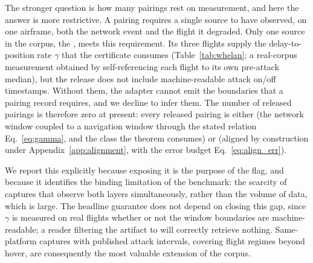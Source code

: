 The stronger question is how many pairings rest on measurement, and here the
answer is more restrictive. A  pairing requires a
single source to have observed, on one airframe, both the network event and the
flight it degraded. Only one source in the corpus, the
, meets this requirement. Its three flights supply
the delay-to-position rate $\gamma$ that the certificate consumes
(Table~\ref{tab:whelan}; a real-corpus measurement obtained by
self-referencing each flight to its own pre-attack median), but the release does
not include machine-readable attack on/off timestamps. Without them, the
adapter cannot emit the  boundaries that a pairing record
requires, and we decline to infer them. The number of released
 pairings is therefore zero at present: every
released pairing is either  (the network window coupled to
a navigation window through the stated relation Eq.~\eqref{eq:gamma}, and the
class the theorem consumes) or  (aligned by
construction under Appendix~\ref{app:alignment}, with the error budget
Eq.~\eqref{eq:align_err}).

We report this explicitly because exposing it is the purpose of the flag, and
because it identifies the binding limitation of the benchmark: the scarcity of
captures that observe both layers simultaneously, rather than the volume of
data, which is large. The headline guarantee does not depend on closing this
gap, since $\gamma$ is measured on real flights whether or not the window
boundaries are machine-readable; a reader filtering the artifact to
 will correctly retrieve nothing. Same-platform captures with published attack intervals, covering
flight regimes beyond hover, are consequently the most valuable extension of
the corpus.

\begin{table}[t]
\centering
\caption{Acquisition provenance across the ingested corpus. Counts come from
the schema-validated adapter outputs, and the split is machine-generated by
 so the paper cannot drift from the
artifact. Acquisition is a property of the source; the strictly stronger
 distribution is discussed in the text.}
\label{tab:provenance}
\small
\renewcommand{\arraystretch}{1.05}

\end{table}

